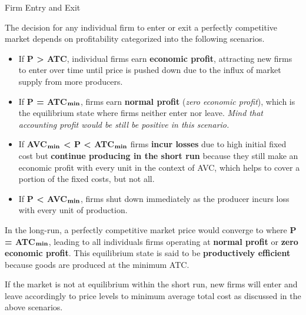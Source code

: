 \documentclass[10pt]{article}
\begin{document}
  \begin{core}{Firm Entry and Exit}

    The decision for any individual firm to enter or exit a perfectly competitive market depends on profitability categorized into the following scenarios.

    \begin{itemize}

      \item If \textbf{P > ATC}, individual firms earn \textbf{economic profit}, attracting new firms to enter over time until price is pushed down due to the influx of market supply from more producers.


      \item If \textbf{P = ATC$_{\text{\textbf{min}}}$}, firms earn \textbf{normal profit} (\textit{zero economic profit}), which is the equilibrium state where firms neither enter nor leave. \textit{Mind that accounting profit would be still be positive in this scenario.}


      \item If \textbf{AVC$_{\text{\textbf{min}}}$ < P < ATC$_{\text{\textbf{min}}}$} firms \textbf{incur losses} due to high initial fixed cost but \textbf{continue producing in the short run} because they still make an economic profit with every unit in the context of AVC, which helps to cover a portion of the fixed costs, but not all.


      \item If \textbf{P < AVC$_{\text{\textbf{min}}}$}, firms shut down immediately as the producer incurs loss with every unit of production.


    \end{itemize}

    In the long-run, a perfectly competitive market price would converge to where \textbf{P = ATC$_{\text{\textbf{min}}}$}, leading to all individuals firms operating at \textbf{normal profit} or \textbf{zero economic profit}. This equilibrium state is said to be \textbf{productively efficient} because goods are produced at the minimum ATC.

    If the market is not at equilibrium within the short run, new firms will enter and leave accordingly to price levels to minimum average total cost as discussed in the above scenarios.

  \end{core}
\end{document}
